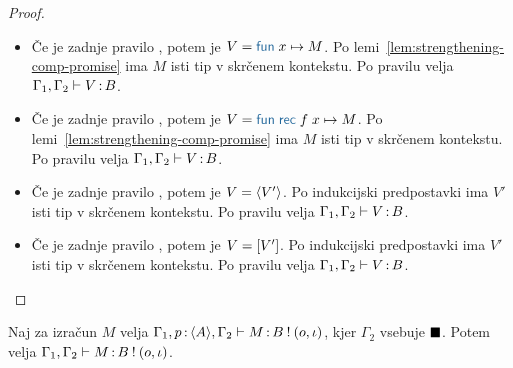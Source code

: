\begin{proof}
\begin{itemize}
		\item Če je zadnje pravilo , potem je $V = \tmfunano{x}{M}$.
		Po lemi~\ref{lem:strengthening-comp-promise} ima $M$ isti tip v skrčenem kontekstu.
		Po pravilu  velja $\Gamma_1, \Gamma_2 \vdash V \mathinner{:} B$.
		
		\item Če je zadnje pravilo , potem je $V = \tmfunrecano{f}{x}{M}$.
		Po lemi~\ref{lem:strengthening-comp-promise} ima $M$ isti tip v skrčenem kontekstu.
		Po pravilu  velja $\Gamma_1, \Gamma_2 \vdash V \mathinner{:} B$.
		
		\item Če je zadnje pravilo , potem je $V = \langle V' \rangle$.
		Po indukcijski predpostavki ima $V'$ isti tip v skrčenem kontekstu.
		Po pravilu  velja $\Gamma_1, \Gamma_2 \vdash V \mathinner{:} B$.
		
		\item Če je zadnje pravilo , potem je $V = [V']$.
		Po indukcijski predpostavki ima $V'$ isti tip v skrčenem kontekstu.
		Po pravilu  velja $\Gamma_1, \Gamma_2 \vdash V \mathinner{:} B$.
		
	\end{itemize}
\end{proof}

\begin{lema}\label{lem:strengthening-comp-promise}
	Naj za izračun $M$ velja $\Gamma_1, p \mathinner{:} \langle A \rangle, \Gamma_2 \vdash M \mathinner{:} B \mathbin{!} (o, \iota)$, kjer $\Gamma_2$ vsebuje $\blacksquare$. Potem velja $\Gamma_1, \Gamma_2 \vdash M \mathinner{:} B \mathbin{!} (o, \iota)$.
\end{lema}

